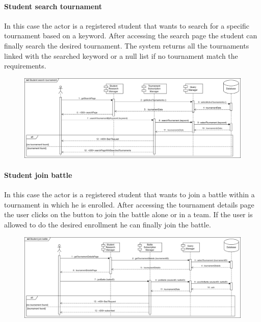 \documentclass[12pt, a4paper]{report}
\begin{document}
    \paragraph*{Student search tournament}
    In this case the actor is a registered student that wants to search for a specific tournament based on a keyword. 
    After accessing the search page the student can finally search the desired tournament. 
    The system returns all the tournaments linked with the searched keyword or a null list if no tournament match the requirements. 
    \begin{figure}[H]
        \centering
        \includegraphics[width=1.0\linewidth]{images/sstrv.png}
    \end{figure}

    \paragraph*{Student join battle}
    In this case the actor is a registered student that wants to join a battle within a tournament in which he is enrolled. 
    After accessing the tournament details page the user clicks on the button to join the battle alone or in a team. 
    If the user is allowed to do the desired enrollment he can finally join the battle. 
    \begin{figure}[H]
        \centering
        \includegraphics[width=1.0\linewidth]{images/sjbrv.png}
    \end{figure}
\end{document}
